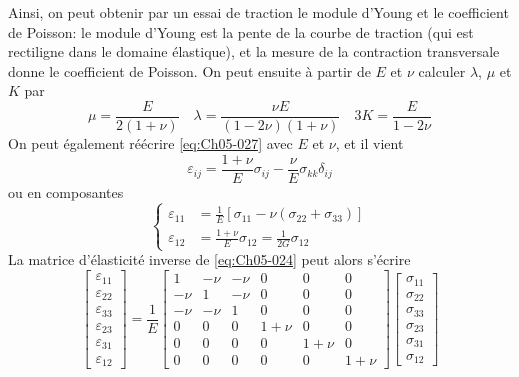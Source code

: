 Ainsi, on peut obtenir par un essai de traction le module d'Young et le coefficient de Poisson: le module d'Young est la pente de la courbe de traction (qui est rectiligne dans le domaine élastique), et la mesure de la contraction transversale donne le coefficient de Poisson.
On peut ensuite à partir de $E$ et $\nu$ calculer $\lambda$, $\mu$ et $K$ par 
\begin{equation}
    \mu = \frac{E}{2 \left( 1+\nu \right)} \quad \lambda = \frac{\nu E}{\left( 1 - 2 \nu \right)\left( 1 + \nu \right)} \quad 3 K = \frac{E}{1 - 2\nu}
    \label{eq:Ch05-033}
\end{equation}
On peut également réécrire \eqref{eq:Ch05-027} avec $E$ et $\nu$, et il vient 
\begin{equation}
    \varepsilon_{ij} = \frac{1 + \nu}{E} \sigma_{ij} - \frac{\nu}{E} \sigma_{kk} \delta_{ij}
    \label{eq:Ch05-034}
\end{equation}
ou en composantes 
\begin{equation}
    \left\{
    \begin{aligned}
        \varepsilon_{11} &= \frac{1}{E} \left[ \sigma_{11} - \nu \left( \sigma_{22} + \sigma_{33}\right) \right] \\
        \varepsilon_{12} &= \frac{1+ \nu}{E} \sigma_{12} = \frac{1}{2G} \sigma_{12}
    \end{aligned}\right.
    \label{eq:Ch05-035}
\end{equation}
La matrice d'élasticité inverse de \eqref{eq:Ch05-024} peut alors s'écrire 
\begin{equation}
    \begin{bmatrix}
        \varepsilon_{11}\\
        \varepsilon_{22}\\
        \varepsilon_{33}\\
        \varepsilon_{23}\\
        \varepsilon_{31}\\
        \varepsilon_{12}
    \end{bmatrix}
    =
    \frac{1}{E}
    \begin{bmatrix}
        1    & -\nu & -\nu & 0     & 0     & 0 \\
        -\nu & 1    & -\nu & 0     & 0     & 0 \\
        -\nu & -\nu & 1    & 0     & 0     & 0 \\
        0    & 0    & 0    & 1+\nu & 0     & 0 \\
        0    & 0    & 0    & 0     & 1+\nu & 0 \\
        0    & 0    & 0    & 0     & 0     & 1+\nu
    \end{bmatrix}
    \begin{bmatrix}
        \sigma_{11}\\
        \sigma_{22}\\
        \sigma_{33}\\
        \sigma_{23}\\
        \sigma_{31}\\
        \sigma_{12}
    \end{bmatrix}
    \label{eq:Ch05-036}
\end{equation}

